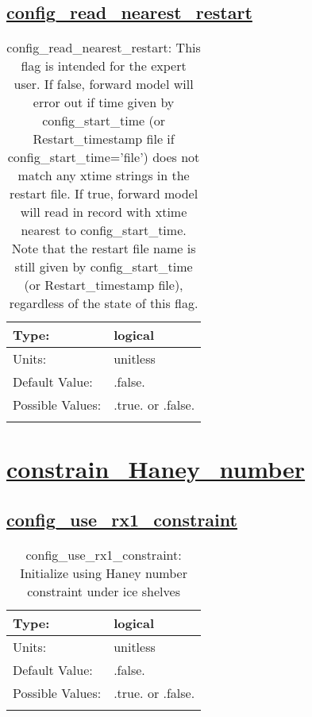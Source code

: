 \subsection[config\_read\_nearest\_restart]{\hyperref[sec:nm_tab_debug]{config\_read\_nearest\_restart}}
\label{subsec:nm_sec_config_read_nearest_restart}
\begin{center}
\begin{longtable}{| p{2.0in} || p{4.0in} |}
    \hline
    Type: & logical \\
    \hline
    Units: & \si{unitless} \\
    \hline
    Default Value: & .false. \\
    \hline
    Possible Values: & .true. or .false. \\
    \hline
    \caption{config\_read\_nearest\_restart: This flag is intended for the expert user.  If false, forward model will error out if time given by config\_start\_time (or Restart\_timestamp file if config\_start\_time='file') does not match any xtime strings in the restart file.  If true, forward model will read in record with xtime nearest to config\_start\_time.  Note that the restart file name is still given by config\_start\_time (or Restart\_timestamp file), regardless of the state of this flag.}
\end{longtable}
\end{center}
\section[constrain\_Haney\_number]{\hyperref[sec:nm_tab_constrain_Haney_number]{constrain\_Haney\_number}}
\label{sec:nm_sec_constrain_Haney_number}
\subsection[config\_use\_rx1\_constraint]{\hyperref[sec:nm_tab_constrain_Haney_number]{config\_use\_rx1\_constraint}}
\label{subsec:nm_sec_config_use_rx1_constraint}
\begin{center}
\begin{longtable}{| p{2.0in} || p{4.0in} |}
    \hline
    Type: & logical \\
    \hline
    Units: & \si{unitless} \\
    \hline
    Default Value: & .false. \\
    \hline
    Possible Values: & .true. or .false. \\
    \hline
    \caption{config\_use\_rx1\_constraint: Initialize using Haney number constraint under ice shelves}
\end{longtable}
\end{center}
